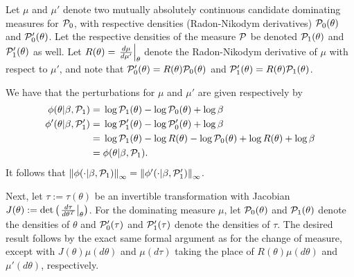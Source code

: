 %

Let $\mu$ and $\mu'$ denote two mutually absolutely continuous candidate
dominating measures for $\mathcal{P}_{0}$, with respective densities (Radon-Nikodym
derivatives) $\mathcal{P}_{0}(\theta)$ and $\mathcal{P}_{0}'(\theta)$.  Let the respective
densities of the measure $\mathcal{P}$ be denoted $\mathcal{P}_{1}(\theta)$ and $\mathcal{P}_{1}'(\theta)$ as
well.  Let $R(\theta) = \left.\frac{d\mu}{d\mu'}\right\vert_{\theta}$ denote the Radon-Nikodym
derivative of $\mu$ with respect to $\mu'$, and note that $\mathcal{P}_{0}'(\theta) =
R(\theta) \mathcal{P}_{0}(\theta)$ and $\mathcal{P}_{1}'(\theta) = R(\theta) \mathcal{P}_{1}(\theta)$.

We have that the perturbations for $\mu$ and $\mu'$ are given respectively by
%
\begin{align*}
%
\phi(\theta \vert \beta, \palt) ={}&
  \log \palt(\theta) - \log \pbase(\theta) + \log \beta \\
\phi'(\theta \vert \beta, \palt') ={}&
    \log \palt'(\theta) - \log \pbase'(\theta) + \log \beta
\\={}&
\log \palt(\theta) - \log R(\theta)
    - \log \pbase(\theta) + \log R(\theta)+ \log \beta
\\={}&
\phi(\theta \vert \beta, \palt).
%
\end{align*}
%
It follows that $\left\Vert\phi(\cdot \vert \beta, \mathcal{P}_{1})\right\Vert_{\infty} = \left\Vert\phi'(\cdot
\vert \beta, \mathcal{P}_{1}')\right\Vert_{\infty}$.

Next, let $\tau := \tau(\theta)$ be an invertible transformation with Jacobian
$J(\theta) := \mathrm{det}\left(\left.\frac{d\tau}{d\theta^T}\right\vert_{\theta}\right)$. For
the dominating measure $\mu$, let $\mathcal{P}_{0}(\theta)$ and $\mathcal{P}_{1}(\theta)$ denote
the densities of $\theta$ and $\mathcal{P}_{0}'(\tau)$ and $\mathcal{P}_{1}'(\tau)$ denote the
densities of $\tau$.  The desired result follows by the exact same formal
argument as for the change of measure, except with $J(\theta) \mu(d\theta)$
and $\mu(d\tau)$ taking the place of $R(\theta) \mu(d\theta)$ and
$\mu'(d\theta)$, respectively.
%






